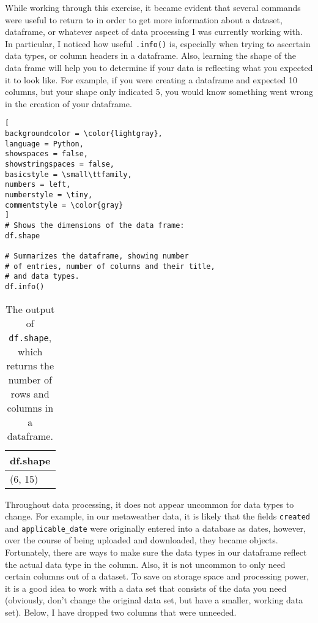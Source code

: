 \documentclass[]{article}
\newcommand{\code}[1]{\colorbox{light-gray}{\texttt{#1}}}
\begin{document}
While working through this exercise, it became evident that several commands were useful to return to in order to get more information about a dataset, dataframe, or whatever aspect of data processing I was currently working with.  In particular, I noticed how useful \code{.info()} is, especially when trying to ascertain data types, or column headers in a dataframe.  Also, learning the shape of the data frame will help you to determine if your data is reflecting what you expected it to look like.  For example, if you were creating a dataframe and expected 10 columns, but your shape only indicated 5, you would know something went wrong in the creation of your dataframe.

\begin{lstlisting}[
backgroundcolor = \color{lightgray},
language = Python,
showspaces = false,
showstringspaces = false,
basicstyle = \small\ttfamily,
numbers = left,
numberstyle = \tiny,
commentstyle = \color{gray}
]
# Shows the dimensions of the data frame:
df.shape

# Summarizes the dataframe, showing number
# of entries, number of columns and their title,
# and data types.
df.info()

\end{lstlisting}
\begin{table}[!ht]
	\begin{center}
		\caption{The output of \code{df.shape}, which returns the number of rows and columns in a dataframe.}
		\label{tab:table1}
		\begin{tabular}{|l|} 
			\hline
			\textbf{df.shape} \\
			\hline
			(6, 15)  \\
			\hline
		\end{tabular}
	\end{center}
\end{table}



Throughout data processing, it does not appear uncommon for data types to change.  For example, in our metaweather data, it is likely that the fields \code{created} and \code{applicable\_date} were originally entered into a database as dates, however, over the course of being uploaded and downloaded, they became objects.  Fortunately, there are ways to make sure the data types in our dataframe reflect the actual data type in the column.  Also, it is not uncommon to only need certain columns out of a dataset.  To save on storage space and processing power, it is a good idea to work with a data set that consists of the data you need (obviously, don't change the original data set, but have a smaller, working data set).  Below, I have dropped two columns that were unneeded.
\end{document}
